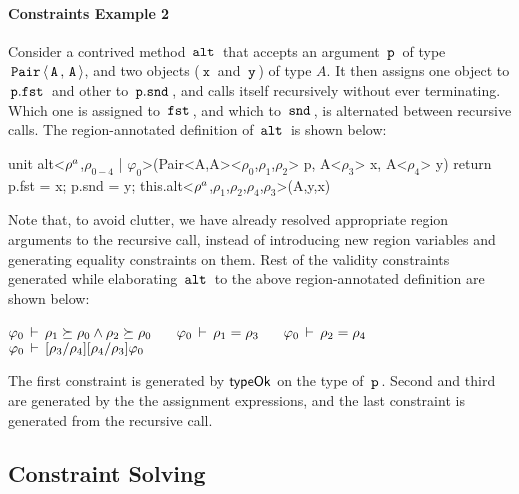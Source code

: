 \paragraph{Constraints Example 2} Consider a contrived method
$\,{\tt alt}\,$ that accepts an argument $\,{\tt p}\,$ of type
$\,{\tt Pair}\,\langle \,{\tt A}\,,\,{\tt A}\, \rangle$, and two objects ($\,{\tt x}\,$ and $\,{\tt y}\,$)
of type $A$. It then assigns one object to $\,{\tt p.fst}\,$ and other to
$\,{\tt p.snd}\,$, and calls itself recursively without ever terminating.
Which one is assigned to $\,{\tt fst}\,$, and which to $\,{\tt snd}\,$, is
alternated between recursive calls. The region-annotated definition of
$\,{\tt alt}\,$ is shown below:
\begin{codejava}
unit alt<$\rho^a$,$\rho_{0-4}$ | $\varphi_0$>(Pair<A,A><$\rho_0$,$\rho_1$,$\rho_2$> p,
                          A<$\rho_3$> x, A<$\rho_4$> y) {
  return p.fst = x; p.snd = y; 
         this.alt<$\rho^a$,$\rho_1$,$\rho_2$,$\rho_4$,$\rho_3$>(A,y,x)
}
\end{codejava}
Note that, to avoid clutter, we have already resolved appropriate
region arguments to the recursive call, instead of introducing new
region variables and generating equality constraints on them. Rest of
the validity constraints generated while elaborating $\,{\tt alt}\,$ to the
above region-annotated definition are shown below:
\begin{center}
\(\varphi_0\,\vdash\,\rho_1 \succeq \rho_0 \wedge \rho_2 \succeq \rho_0\)
$\quad$
\(\varphi_0\,\vdash\,\rho_1 = \rho_3\)
$\quad$
\(\varphi_0\,\vdash\,\rho_2 = \rho_4\)\\
\(\varphi_0\,\vdash\,[\rho_3/\rho_4][\rho_4/\rho_3]\varphi_0\)
\end{center}
The first constraint is generated by ${\sf typeOk}$ on the type of $\,{\tt p}\,$.
Second and third are generated by the the assignment expressions, and
the last constraint is generated from the recursive call.

\subsection{Constraint Solving}
\label{sec:fb-constraintsolving}

